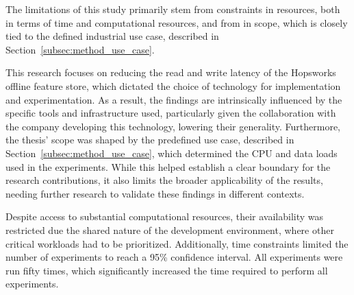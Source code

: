 The limitations of this study primarily stem from constraints in resources, both in terms of time and computational resources, and from in scope, which is closely tied to the defined industrial use case, described in Section~\ref{subsec:method_use_case}.

This research focuses on reducing the read and write latency of the Hopsworks offline feature store, which dictated the choice of technology for implementation and experimentation. As a result, the findings are intrinsically influenced by the specific tools and infrastructure used, particularly given the collaboration with the company developing this technology, lowering their generality. Furthermore, the thesis' scope was shaped by the predefined use case, described in Section~\ref{subsec:method_use_case}, which determined the \gls{CPU} and data loads used in the experiments. While this helped establish a clear boundary for the research contributions, it also limits the broader applicability of the results, needing further research to validate these findings in different contexts.

Despite access to substantial computational resources, their availability was restricted due the shared nature of the development environment, where other critical workloads had to be prioritized. Additionally, time constraints limited the number of experiments to reach a 95\% confidence interval. All experiments were run fifty times, which significantly increased the time required to perform all experiments.
